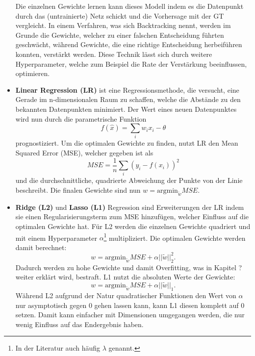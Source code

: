 \begin{itemize}
    Die einzelnen Gewichte lernen kann dieses Modell indem es die Datenpunkt durch das (untrainierte) Netz
    schickt und die Vorhersage mit der GT vergleicht. In einem Verfahren, was sich Backtracking nennt, werden
    im Grunde die Gewichte, welcher zu einer falschen Entscheidung führten geschwächt, während Gewichte, die
    eine richtige Entscheidung herbeiführen konnten, verstärkt werden. Diese Technik lässt sich durch weitere
    Hyperparameter, welche zum Beispiel die Rate der Verstärkung beeinflussen, optimieren.

   \item \textbf{Linear Regression (LR)} ist eine Regressionsmethode, die versucht, eine Gerade im
    n-dimensionalen Raum zu schaffen, welche die Abstände zu den bekannten Datenpunkten minimiert. Der
    Wert eines neuen Datenpunktes wird nun durch die parametrische Funktion
    \begin{equation}
        f(\hat{x}) = \sum_i w_ix_i - \theta
    \end{equation}
    prognostiziert. Um die optimalen Gewichte zu finden, nutzt LR den Mean
    Squared Error (MSE), welcher gegeben ist als
    \begin{equation}
        MSE = \frac{1}{n} \sum_i(y_i-f(x_i))^2
    \end{equation}
    und die durchschnittliche, quadrierte Abweichung der Punkte von der Linie beschreibt. Die finalen
    Gewichte sind nun $w = \text{argmin}_{\tilde{w}} MSE$.

   \item \textbf{Ridge (L2)} und \textbf{Lasso (L1)} Regression sind Erweiterungen der LR indem sie einen
    Regularisierungsterm zum MSE hinzufügen, welcher Einfluss auf die optimalen Gewichte hat. Für L2 werden
    die einzelnen Gewichte quadriert und mit einem Hyperparameter $\alpha$\footnote{In der Literatur auch
    häufig $\lambda$ genannt.} multipliziert. Die optimalen Gewichte werden
    damit berechnet: 
    \begin{equation}
        w = \text{argmin}_{\tilde{w}} MSE + \alpha||\tilde{w}||_2^2.
    \end{equation}
    Dadurch werden zu hohe Gewichte und damit Overfitting, was in Kapitel ? weiter erklärt wird, bestraft.
    L1 nutzt die absoluten Werte der Gewichte:
    \begin{equation}
        w = \text{argmin}_{\tilde{w}} MSE + \alpha||\tilde{w}||_1.
    \end{equation}
    Während L2 aufgrund der Natur quadratischer Funktionen den Wert von $\alpha$ nur asymptotisch gegen $0$ gehen
    lassen kann, kann L1 diesen komplett auf $0$ setzen. Damit kann einfacher mit Dimensionen umgegangen werden,
    die nur wenig Einfluss auf das Endergebnis haben.

\end{itemize}


